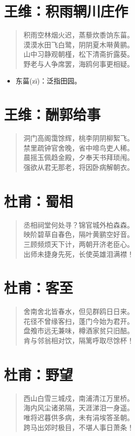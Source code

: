 \documentclass[12pt,oneside]{book}
\newenvironment{shici}{
\begin{verse}
\centering\large\hspace{12pt}}
{\end{verse}}
\begin{document}
\chapter{王维：积雨辋川庄作}
\begin{shici}
积雨空林烟火迟，蒸藜炊黍饷东菑。\\
漠漠水田飞白鹭，阴阴夏木啭黄鹂。\\
山中习静观朝槿，松下清斋折露葵。\\
野老与人争席罢，海鸥何事更相疑。
\end{shici}

\begin{itemize}
\item 东菑(zī)：泛指田园。
\end{itemize}

\chapter{王维：酬郭给事}
\begin{shici}
洞门高阁霭馀辉，桃李阴阴柳絮飞。\\
禁里疏钟官舍晚，省中啼鸟吏人稀。\\
晨摇玉佩趋金殿，夕奉天书拜琐闱。\\
强欲从君无那老，将因卧病解朝衣。
\end{shici}

\chapter{杜甫：蜀相}
\begin{shici}
丞相祠堂何处寻？锦官城外柏森森。\\
映阶碧草自春色，隔叶黄鹂空好音。\\
三顾频烦天下计，两朝开济老臣心。\\
出师未捷身先死，长使英雄泪满襟！
\end{shici}

\chapter{杜甫：客至}
\begin{shici}
舍南舍北皆春水，但见群鸥日日来。\\
花径不曾缘客扫，蓬门今始为君开。\\
盘飧市远无兼味，樽酒家贫只旧醅。\\
肯与邻翁相对饮，隔篱呼取尽馀杯！
\end{shici}

\chapter{杜甫：野望}
\begin{shici}
西山白雪三城戍，南浦清江万里桥。\\
海内风尘诸弟隔，天涯涕泪一身遥。\\
唯将迟暮供多病，未有涓埃答圣朝。\\
跨马出郊时极目，不堪人事日萧条！
\end{shici}
\end{document}
